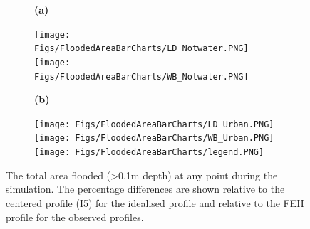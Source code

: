 \documentclass[APA,Times2COL]{WileyNJDv5}
\begin{document}
\begin{figure}[!t]
  \begin{subfigure}[b]{\textwidth}
                        \textbf{(a)}
  \end{subfigure}
    \begin{subfigure}[b]{\textwidth}
        \centering
        \texttt{[image: Figs/FloodedAreaBarCharts/LD\_Notwater.PNG]}%
        \texttt{[image: Figs/FloodedAreaBarCharts/WB\_Notwater.PNG]}
    \end{subfigure}
      \begin{subfigure}[b]{\textwidth}
                        \textbf{(b)}
  \end{subfigure}
    \begin{subfigure}[b]{\textwidth}
        \centering
        \texttt{[image: Figs/FloodedAreaBarCharts/LD\_Urban.PNG]}%
        \texttt{[image: Figs/FloodedAreaBarCharts/WB\_Urban.PNG]}
        \raggedleft
        \texttt{[image: Figs/FloodedAreaBarCharts/legend.PNG]}
    \end{subfigure}
\caption{The total area flooded (\textgreater 0.1m depth) at any point during the simulation. The percentage differences are shown relative to the centered profile (I5) for the idealised profile and relative to the FEH profile for the observed profiles.} \label{fig:total_flooded_area} 
\end{figure}









\end{document}
